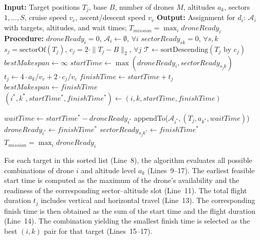 \documentclass[subscriptcorrection,upint,nolists, varvw,barcolor=Goldenrod3,mathalfa=cal=euler,balance,hyphenate,french]{asmejour} %
\begin{document}
\begin{algorithm}[H]
\caption{Descending Cost Scheduling (DCS) Algorithm}
\begin{algorithmic}[1]
\STATE \textbf{Input:} Target positions $T_j$, base $B$, number of drones $M$, altitudes $a_k$, sectors $1,\ldots,S$, cruise speed $v_c$, ascent/descent speed $v_v$
\STATE \textbf{Output:} Assignment for $d_i$: $\mathcal{A}_i$ with targets, altitudes, and wait times; $T_{\mathit{mission}} = \max_{i} \mathit{droneReady}_{i}$
\STATE \textbf{Procedure:}
\STATE $\mathit{droneReady}_i = 0$, $\mathcal{A}_i \leftarrow \emptyset$, $\forall i$
\STATE $\mathit{sectorReady}_{sk} = 0$, $\forall s,k$
\STATE $s_j = \text{sectorOf}(T_j)$, $c_j = 2\cdot\|T_j - B\|_2$, $\forall j$
\STATE $\mathcal{T} \gets \text{sortDescending}(T_j \text{ by } c_j)$
    \STATE $bestMakespan \gets \infty$
            \STATE $startTime \gets \max(\mathit{droneReady}_i,
            \mathit{sectorReady}_{s_jk})$
            \STATE $t_j \gets 4 \cdot {a_k}/v_v + 2 \cdot c_j/v_c$
            \STATE $finishTime \gets startTime + t_j$
                \STATE $bestMakespan \gets finishTime$
                \STATE $(i^\ast, k^\ast, startTime^\ast, finishTime^\ast) \gets (i, k, startTime, finishTime)$
            \ENDIF
        \ENDFOR   
        
    \ENDFOR
    \STATE $waitTime \gets startTime^\ast - \mathit{droneReady}_{i^\ast}$
    \STATE appendTo($\mathcal{A}_{i^\ast}, (T_j, a_{k^\ast}, waitTime)$)
    \STATE $\mathit{droneReady}_{i^\ast} \gets finishTime^\ast$
    \STATE $\mathit{sectorReady}_{s_jk^\ast} \gets finishTime^\ast$
\ENDFOR
\STATE $T_{\mathit{mission}} = \max_i \mathit{droneReady}_i$
\end{algorithmic}
\label{alg:DCS}
\end{algorithm}


For each target in this sorted list (Line~8), the algorithm evaluates all possible combinations of drone $i$ and altitude level $a_k$ (Lines~9–17). 
The earliest feasible start time is computed as the maximum of the drone’s availability and the readiness of the corresponding sector–altitude slot (Line~11). 
The total flight duration $t_j$ includes vertical and horizontal travel (Line~13).
The corresponding finish time is then obtained as the sum of the start time and the flight duration (Line~14).
The combination yielding the smallest finish time is selected as the best $(i,k)$ pair for that target (Lines~15–17).
\end{document}
